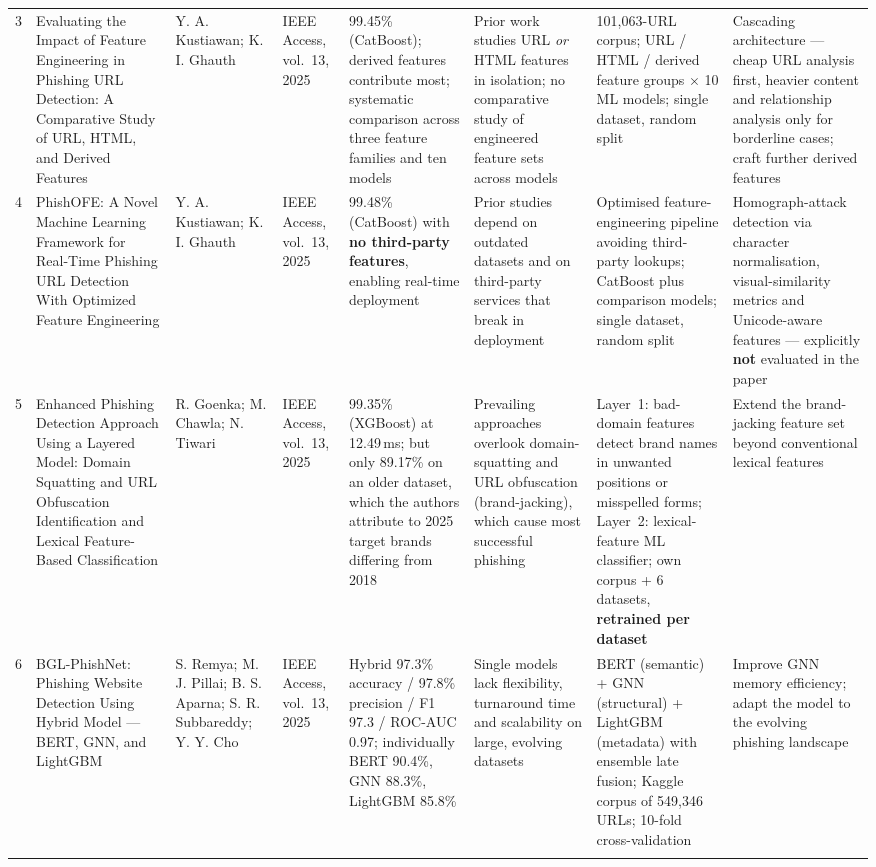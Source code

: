 \documentclass[10pt,a4paper]{article}
\begin{document}
{\begin{longtable}{@{}L{4mm} L{34mm} L{26mm} L{22mm} L{40mm} L{34mm} L{40mm} L{34mm}@{}}
3 & Evaluating the Impact of Feature Engineering in Phishing URL Detection: A Comparative Study
of URL, HTML, and Derived Features &
Y. A. Kustiawan; K. I. Ghauth &
IEEE Access, vol.~13, 2025 &
99.45\% (CatBoost); derived features contribute most; systematic comparison across three feature
families and ten models &
Prior work studies URL \emph{or} HTML features in isolation; no comparative study of engineered
feature sets across models &
101,063-URL corpus; URL / HTML / derived feature groups $\times$ 10 ML models; single dataset,
random split &
Cascading architecture --- cheap URL analysis first, heavier content and relationship analysis
only for borderline cases; craft further derived features \\
\addlinespace

4 & PhishOFE: A Novel Machine Learning Framework for Real-Time Phishing URL Detection With
Optimized Feature Engineering &
Y. A. Kustiawan; K. I. Ghauth &
IEEE Access, vol.~13, 2025 &
99.48\% (CatBoost) with \textbf{no third-party features}, enabling real-time deployment &
Prior studies depend on outdated datasets and on third-party services that break in deployment &
Optimised feature-engineering pipeline avoiding third-party lookups; CatBoost plus comparison
models; single dataset, random split &
Homograph-attack detection via character normalisation, visual-similarity metrics and
Unicode-aware features --- explicitly \textbf{not} evaluated in the paper \\
\addlinespace

5 & Enhanced Phishing Detection Approach Using a Layered Model: Domain Squatting and URL
Obfuscation Identification and Lexical Feature-Based Classification &
R. Goenka; M. Chawla; N. Tiwari &
IEEE Access, vol.~13, 2025 &
99.35\% (XGBoost) at 12.49\,ms; but only 89.17\% on an older dataset, which the authors attribute
to 2025 target brands differing from 2018 &
Prevailing approaches overlook domain-squatting and URL obfuscation (brand-jacking), which cause
most successful phishing &
Layer~1: bad-domain features detect brand names in unwanted positions or misspelled forms;
Layer~2: lexical-feature ML classifier; own corpus + 6 datasets, \textbf{retrained per dataset} &
Extend the brand-jacking feature set beyond conventional lexical features \\
\addlinespace

6 & BGL-PhishNet: Phishing Website Detection Using Hybrid Model --- BERT, GNN, and LightGBM &
S. Remya; M. J. Pillai; B. S. Aparna; S. R. Subbareddy; Y. Y. Cho &
IEEE Access, vol.~13, 2025 &
Hybrid 97.3\% accuracy / 97.8\% precision / F1 97.3 / ROC-AUC 0.97; individually BERT 90.4\%,
GNN 88.3\%, LightGBM 85.8\% &
Single models lack flexibility, turnaround time and scalability on large, evolving datasets &
BERT (semantic) + GNN (structural) + LightGBM (metadata) with ensemble late fusion; Kaggle corpus
of 549,346 URLs; 10-fold cross-validation &
Improve GNN memory efficiency; adapt the model to the evolving phishing landscape \\
\addlinespace


\end{longtable}}
\end{document}
